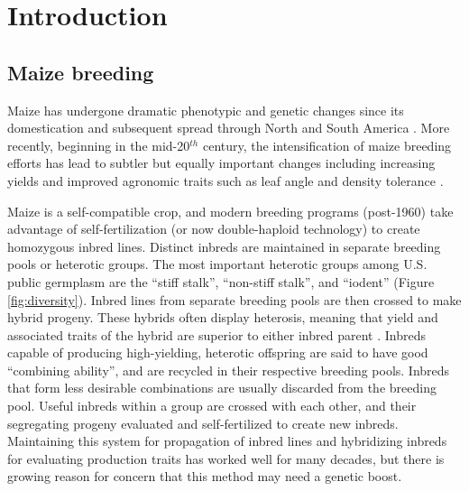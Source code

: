 \documentclass[draft,12pt]{article}
\begin{document}
\section*{Introduction}
\label{sec:introduction}



\subsection*{Maize breeding}
Maize has undergone dramatic phenotypic and genetic changes since its domestication and subsequent spread through North and South America \citep{daFonseca:2015ey,Doebley:2004ce}. More recently, beginning in the mid-20$^{th}$ century, the intensification of maize breeding efforts has lead to subtler but equally important changes including increasing yields and improved agronomic traits such as leaf angle and density tolerance \citep{duvick2005contribution}. 

Maize is  a self-compatible crop, and modern breeding programs (post-1960) take advantage of self-fertilization (or now double-haploid technology) to create homozygous inbred lines. 
Distinct inbreds are maintained in separate breeding pools or heterotic groups.
The most important heterotic groups among U.S. public germplasm are the ``stiff stalk'', ``non-stiff stalk'', and ``iodent'' (Figure \ref{fig:diversity}).
Inbred lines from separate breeding pools are then crossed to make hybrid progeny.  
These hybrids often display heterosis, meaning that yield and associated traits of the hybrid are superior to  either inbred parent \citep{Springer:2007bj}.  
Inbreds capable of producing high-yielding, heterotic offspring are said to have good ``combining ability'', and are recycled in their respective breeding pools.
Inbreds that form less desirable combinations are usually discarded from the breeding pool. 
Useful inbreds within a group are crossed with each other, and their segregating progeny evaluated and self-fertilized to create new inbreds. 
Maintaining this system for propagation of inbred lines and hybridizing inbreds for evaluating production traits has worked well for many decades, but there is growing reason for concern that this method may need a genetic boost. 
\end{document}
